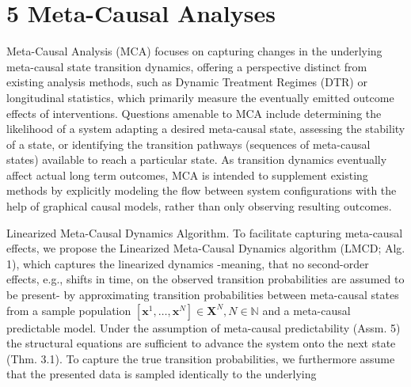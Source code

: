 \documentclass[10pt]{article}
\begin{document}
\section*{5 Meta-Causal Analyses}
Meta-Causal Analysis (MCA) focuses on capturing changes in the underlying meta-causal state transition dynamics, offering a perspective distinct from existing analysis methods, such as Dynamic Treatment Regimes (DTR) or longitudinal statistics, which primarily measure the eventually emitted outcome effects of interventions. Questions amenable to MCA include determining the likelihood of a system adapting a desired meta-causal state, assessing the stability of a state, or identifying the transition pathways (sequences of meta-causal states) available to reach a particular state. As transition dynamics eventually affect actual long term outcomes, MCA is intended to supplement existing methods by explicitly modeling the flow between system configurations with the help of graphical causal models, rather than only observing resulting outcomes.

Linearized Meta-Causal Dynamics Algorithm. To facilitate capturing meta-causal effects, we propose the Linearized Meta-Causal Dynamics algorithm (LMCD; Alg. 1), which captures the linearized dynamics -meaning, that no second-order effects, e.g., shifts in time, on the observed transition probabilities are assumed to be present- by approximating transition probabilities between meta-causal states from a sample population $\left[\mathbf{x}^{1}, \ldots, \mathbf{x}^{N}\right] \in \mathbf{X}^{N}, N \in \mathbb{N}$ and a meta-causal predictable model. Under the assumption of meta-causal predictability (Assm. 5) the structural equations are sufficient to advance the system onto the next state (Thm. 3.1). To capture the true transition probabilities, we furthermore assume that the presented data is sampled identically to the underlying
\end{document}
